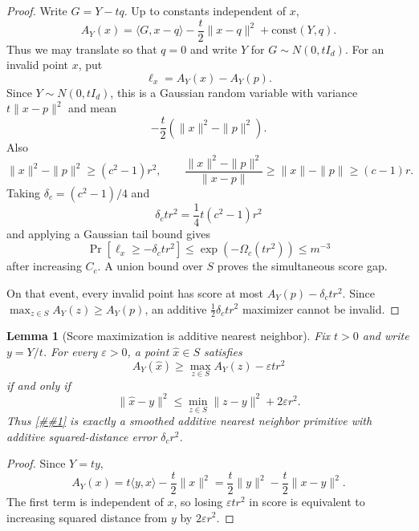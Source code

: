 \documentclass[10pt]{article}
\newcommand{\cref}[1]{\ref{##1}}
\newtheorem{lemma}[theorem]{Lemma}
\theoremstyle{definition}
\newcommand{\ip}[2]{\langle #1,#2\rangle}
\begin{document}
\begin{proof}
   Write $G=Y-tq$. Up to constants independent of $x$,
   \[
      A_Y(x)
      =
      \ip{G}{x-q}-\frac t2\|x-q\|^2+\mathrm{const}(Y,q).
   \]
   Thus we may translate so that $q=0$ and write $Y$ for
   $G\sim N(0,tI_d)$. For an invalid point $x$, put
   \[
      \ell_x=A_Y(x)-A_Y(p).
   \]
   Since $Y\sim N(0,tI_d)$, this is a Gaussian random variable with variance
   $t\|x-p\|^2$ and mean
   \[
      -\frac t2(\|x\|^2-\|p\|^2).
   \]
   Also
   \[
      \|x\|^2-\|p\|^2\ge(c^2-1)r^2,
      \qquad
      \frac{\|x\|^2-\|p\|^2}{\|x-p\|}
      \ge
      \|x\|-\|p\|
      \ge(c-1)r .
   \]
   Taking $\delta_c=(c^2-1)/4$ and
   \[
      \delta_c t r^2=\frac14t(c^2-1)r^2
   \]
   and applying a Gaussian tail bound gives
   \[
      \Pr\!\left[\ell_x\ge-\delta_c t r^2\right]
      \le
      \exp(-\Omega_c(tr^2))
      \le
      m^{-3}
   \]
   after increasing $C_c$. A union bound over $S$ proves the simultaneous
   score gap.

   On that event, every invalid point has score at most
   $A_Y(p)-\delta_c t r^2$. Since $\max_{z\in S}A_Y(z)\ge A_Y(p)$, an additive
   $\frac12\delta_c t r^2$ maximizer cannot be invalid.
\end{proof}

\begin{lemma}[Score maximization is additive nearest neighbor]\label{lem:score-max-additive-nn}
   Fix $t>0$ and write $y=Y/t$. For every $\varepsilon>0$, a point
   $\widehat x\in S$ satisfies
   \[
      A_Y(\widehat x)
      \ge
      \max_{z\in S}A_Y(z)-\varepsilon t r^2
   \]
   if and only if
   \[
      \|\widehat x-y\|^2
      \le
      \min_{z\in S}\|z-y\|^2+2\varepsilon r^2.
   \]
   Thus \cref{asm:smoothed-score-max} is exactly a smoothed additive nearest
   neighbor primitive with additive squared-distance error $\delta_c r^2$.
\end{lemma}

\begin{proof}
   Since $Y=ty$,
   \[
      A_Y(x)
      =
      t\ip{y}{x}-\frac t2\|x\|^2
      =
      \frac t2\|y\|^2-\frac t2\|x-y\|^2.
   \]
   The first term is independent of $x$, so losing $\varepsilon t r^2$ in
   score is equivalent to increasing squared distance from $y$ by
   $2\varepsilon r^2$.
\end{proof}
\end{document}
